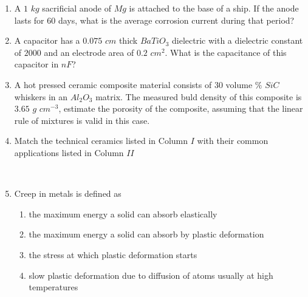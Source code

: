 \documentclass[journal,12pt,onecolumn]{IEEEtran}
\theoremstyle{remark}
\begin{document}
\begin{enumerate}
\item A $1$ $kg$ sacrificial anode of $Mg$  is attached to the base of a ship. If the anode lasts for $60$ days, what is the average corrosion current  during that period?

\hfill{}

\item A capacitor has a $0.075$ $cm$ thick $BaTiO_3$ dielectric with a dielectric constant of $2000$ and an electrode area of $0.2$ $cm^2$. What is the capacitance of this capacitor in $nF$?

\hfill{}

\item A hot pressed ceramic composite material consists of $30$ volume $\%$ $SiC$ whiskers in an $Al_{2}O_{3}$ matrix. The measured buld density of this composite is $3.65$ $g$ $cm^{-3}$, estimate the porosity \brak{\%} of the composite, assuming that the linear rule of mixtures is valid in this case.

\hfill{}

\item Match the technical ceramics listed in Column $I$ with their common applications listed in Column $II$
\\\begin{table}[h!]    
  \centering
  
\end{table}\\

\hfill{}
\begin{enumerate}
\end{enumerate}

\item Creep in metals is defined as

\hfill{}
\begin{enumerate}
\item the maximum energy a solid can absorb elastically
\item the maximum energy a solid can absorb by plastic deformation
\item the stress at which plastic deformation starts
\item slow plastic deformation due to diffusion of atoms usually at high temperatures 
\end{enumerate}


\end{enumerate}
\end{document}

